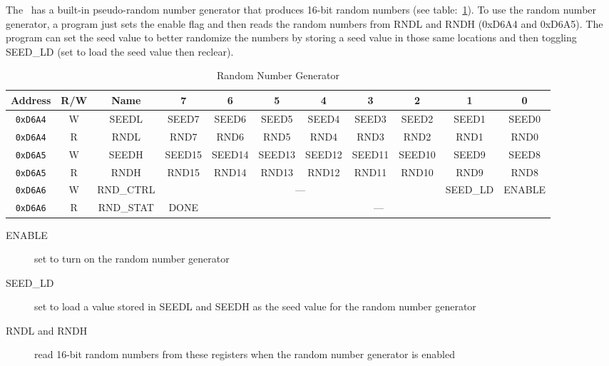 The \jr\ has a built-in pseudo-random number generator that produces 16-bit random numbers (see table:~\ref{tab:rng_reg}). To use the random number generator, a program just sets the enable flag and then reads the random numbers from RNDL and RNDH (0xD6A4 and 0xD6A5). The program can set the seed value to better randomize the numbers by storing a seed value in those same locations and then toggling SEED\_LD (set to load the seed value then reclear).

\begin{table}[h]
    \begin{center}
        \begin{tabular}{|c|c|c|c|c|c|c|c|c|c|c|} \hline
            Address & R/W & Name & 7 & 6 & 5 & 4 & 3 & 2 & 1 & 0 \\\hline\hline
            \verb+0xD6A4+ & W & SEEDL & SEED7 & SEED6 & SEED5 & SEED4 & SEED3 & SEED2 & SEED1 & SEED0 \\ \hline
            \verb+0xD6A4+ & R & RNDL & RND7 & RND6 & RND5 & RND4 & RND3 & RND2 & RND1 & RND0 \\ \hline
            \verb+0xD6A5+ & W & SEEDH & SEED15 & SEED14 & SEED13 & SEED12 & SEED11 & SEED10 & SEED9 & SEED8 \\ \hline
            \verb+0xD6A5+ & R & RNDH & RND15 & RND14 & RND13 & RND12 & RND11 & RND10 & RND9 & RND8 \\ \hline

            \verb+0xD6A6+ & W & RND\_CTRL & \multicolumn{6}{|c|}{---} & SEED\_LD & ENABLE \\ \hline
            \verb+0xD6A6+ & R & RND\_STAT & DONE & \multicolumn{7}{|c|}{---} \\ \hline

        \end{tabular}
    \end{center}
    \caption{Random Number Generator}
    \label{tab:rng_reg}
\end{table}

\begin{description}
    \item[ENABLE] set to turn on the random number generator

    \item[SEED\_LD] set to load a value stored in SEEDL and SEEDH as the seed value for the random number generator

    \item[RNDL and RNDH] read 16-bit random numbers from these registers when the random number generator is enabled
\end{description}

